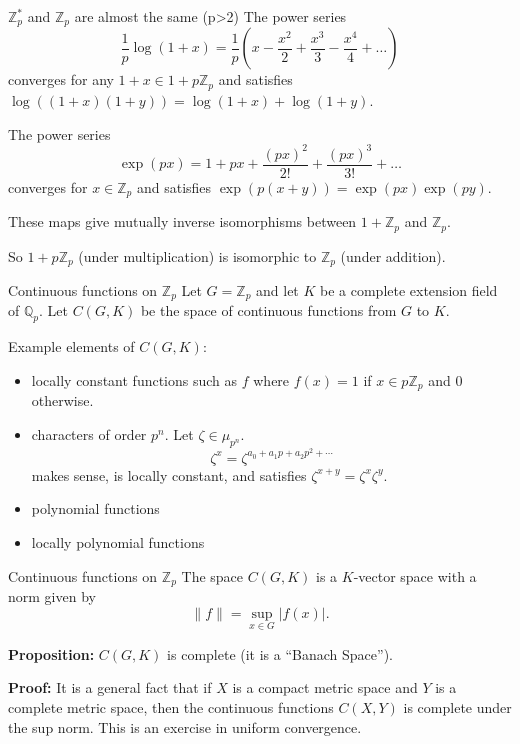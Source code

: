 \documentclass[
  ignorenonframetext,
]{beamer}
\providecommand{\tightlist}{%
  \setlength{\itemsep}{0pt}\setlength{\parskip}{0pt}}
\begin{document}
\begin{frame}{\(\mathbb{Z}_p^{*}\) and \(\mathbb{Z}_p\) are almost the
same (p\textgreater2)}
\protect\hypertarget{mathbbz_p-and-mathbbz_p-are-almost-the-same-p2}{}
The power series \[
\frac{1}{p}\log(1+x)=\frac{1}{p}(x-\frac{x^2}{2}+\frac{x^3}{3}-\frac{x^4}{4}+\ldots)
\] converges for any \(1+x\in 1+p\mathbb{Z}_p\) and satisfies
\(\log((1+x)(1+y))=\log(1+x)+\log(1+y)\).

The power series \[
\exp(px)=1+px+\frac{(px)^2}{2!}+\frac{(px)^3}{3!}+\ldots
\] converges for \(x\in\mathbb{Z}_p\) and satisfies
\(\exp(p(x+y))=\exp(px)\exp(py)\).

These maps give mutually inverse isomorphisms between \(1+\mathbb{Z}_p\)
and \(\mathbb{Z}_p\).

So \(1+p\mathbb{Z}_p\) (under multiplication) is isomorphic to
\(\mathbb{Z}_p\) (under addition).
\end{frame}

\begin{frame}{Continuous functions on \(\mathbb{Z}_p\)}
\protect\hypertarget{continuous-functions-on-mathbbz_p}{}
Let \(G=\mathbb{Z}_p\) and let \(K\) be a complete extension field of
\(\mathbb{Q}_p\). Let \(C(G,K)\) be the space of continuous functions
from \(G\) to \(K\).

Example elements of \(C(G,K)\):

\begin{itemize}
\tightlist
\item
  locally constant functions such as \(f\) where \(f(x)=1\) if
  \(x \in p\mathbb{Z}_p\) and \(0\) otherwise.
\item
  characters of order \(p^{n}\). Let \(\zeta\in\mu_{p^{n}}\).\\
  \[
  \zeta^{x}=\zeta^{a_0+a_1p+a_2p^2+\cdots}
  \] makes sense, is locally constant, and satisfies
  \(\zeta^{x+y}=\zeta^{x}\zeta^{y}.\)
\item
  polynomial functions
\item
  locally polynomial functions
\end{itemize}
\end{frame}

\begin{frame}{Continuous functions on \(\mathbb{Z}_p\)}
\protect\hypertarget{continuous-functions-on-mathbbz_p-1}{}
The space \(C(G,K)\) is a \(K\)-vector space with a norm given by \[
\|f\|=\sup_{x\in G} |f(x)|.
\]

\textbf{Proposition:} \(C(G,K)\) is complete (it is a ``Banach Space'').

\textbf{Proof:} It is a general fact that if \(X\) is a compact metric
space and \(Y\) is a complete metric space, then the continuous
functions \(C(X,Y)\) is complete under the sup norm. This is an exercise
in uniform convergence.
\end{frame}
\end{document}
